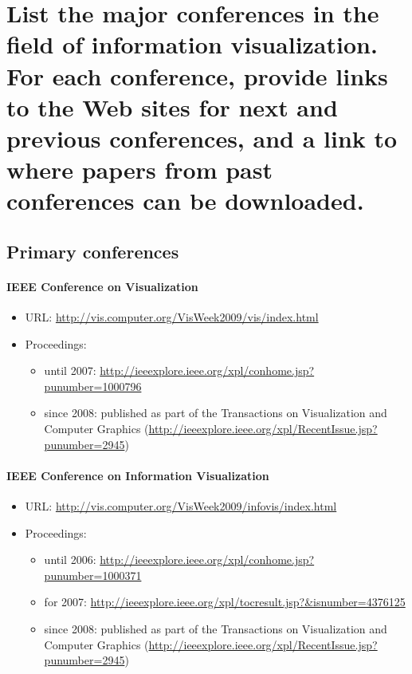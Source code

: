 \section{List the major conferences in the field of information visualization. For each
conference, provide links to the Web sites for next and previous conferences, and a link
to where papers from past conferences can be downloaded.}

\subsection{Primary conferences}
\paragraph{IEEE Conference on Visualization}
\begin{itemize}
	\item URL: \url{http://vis.computer.org/VisWeek2009/vis/index.html}
	\item Proceedings:
			\begin{itemize}
				\item until 2007: \url{http://ieeexplore.ieee.org/xpl/conhome.jsp?punumber=1000796}
  			\item since 2008: published as part of the Transactions on Visualization and Computer Graphics
  										    (\url{http://ieeexplore.ieee.org/xpl/RecentIssue.jsp?punumber=2945})
			\end{itemize}
\end{itemize}

\paragraph{IEEE Conference on Information Visualization}
\begin{itemize}
  \item URL: \url{http://vis.computer.org/VisWeek2009/infovis/index.html}
  \item Proceedings:
  		\begin{itemize}
  			\item until 2006: \url{http://ieeexplore.ieee.org/xpl/conhome.jsp?punumber=1000371}
				\item for 2007:   \url{http://ieeexplore.ieee.org/xpl/tocresult.jsp?&isnumber=4376125}
  			\item since 2008: published as part of the Transactions on Visualization and Computer Graphics
  										    (\url{http://ieeexplore.ieee.org/xpl/RecentIssue.jsp?punumber=2945})
  		\end{itemize}
\end{itemize}

